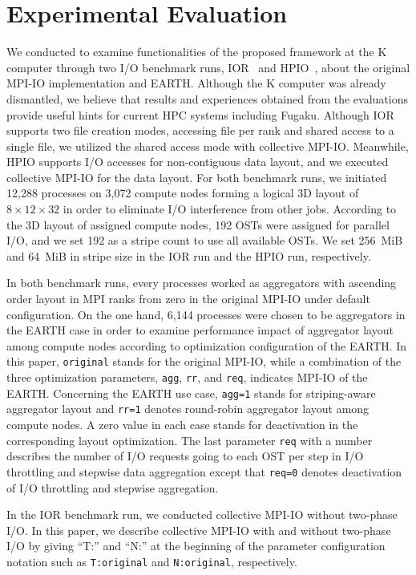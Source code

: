 \documentclass{jhps}
\begin{document}
\section{Experimental Evaluation}
\label{sec:EVAL}

We conducted to examine functionalities of the proposed framework
at the K computer through two I/O benchmark runs,
IOR~\cite{IOR:web} and HPIO~\cite{ching:ipdps06},
about the original MPI-IO implementation and EARTH.
Although the K computer was already dismantled,
we believe that results and experiences obtained from the evaluations
provide useful hints for current HPC systems including Fugaku.
Although IOR supports two file creation modes, accessing
file per rank and shared access to a single file,
we utilized the shared access mode with collective MPI-IO.
Meanwhile, HPIO supports I/O accesses for non-contiguous data layout,
and we executed collective MPI-IO for the data layout.
For both benchmark runs, we initiated 12,288 processes on 3,072 compute nodes
forming a logical 3D layout of $8\times12\times32$ in order to eliminate I/O interference
from other jobs. According to the 3D layout of assigned compute nodes,
192 OSTs were assigned for parallel I/O, and we set 192 as a stripe count
to use all available OSTs.
We set 256~MiB and 64~MiB in stripe size in the IOR run and the HPIO run, respectively.

In both benchmark runs, every processes worked as aggregators
with ascending order layout in MPI ranks from zero in the original MPI-IO
under default configuration.
On the one hand, 6,144 processes were chosen to be aggregators in the EARTH case
in order to examine performance impact of aggregator layout among compute nodes
according to optimization configuration of the EARTH.
In this paper, {\tt original} stands for the original MPI-IO,
while a combination of the three optimization parameters,
{\tt agg}, {\tt rr}, and {\tt req}, indicates MPI-IO of the EARTH.
Concerning the EARTH use case, {\tt agg=1} stands for striping-aware aggregator layout
and {\tt rr=1} denotes round-robin aggregator layout among compute nodes.
A zero value in each case stands for deactivation in the corresponding layout optimization.
The last parameter {\tt req} with a number describes the number of I/O requests
going to each OST per step in I/O throttling and stepwise data aggregation
except that {\tt req=0} denotes deactivation of I/O throttling and stepwise aggregation.

In the IOR benchmark run, we conducted collective MPI-IO without two-phase I/O.
In this paper, we describe collective MPI-IO with and without two-phase I/O
by giving ``T:'' and ``N:'' at the beginning of the parameter configuration notation
such as {\tt T:original} and {\tt N:original}, respectively.
\end{document}
